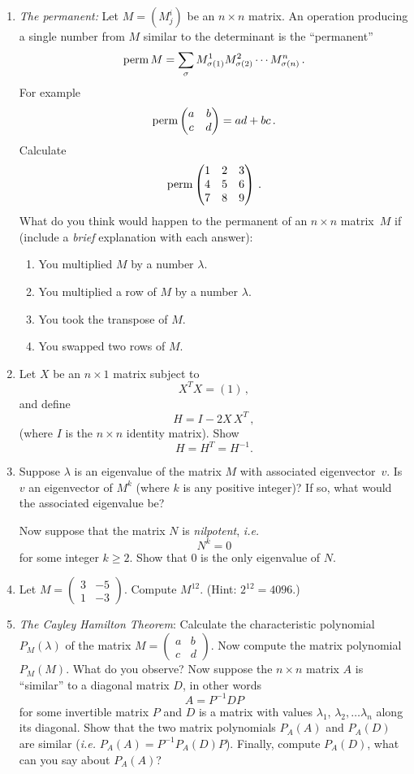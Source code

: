 \begin{enumerate}
\item
{\itshape The permanent:} Let $M=(M^i_j)$ be an $n\times n$ matrix. An operation producing a single number from $M$ similar
to the determinant is the ``permanent''
\[
{\rm perm} \, M =\sum_\sigma M^1_{\sigma(1)} M^2_{\sigma(2)}\cdots M^n_{\sigma(n)}\, .
\]
For example
\[
{\rm perm} \begin{pmatrix}a & b \\ c & d\end{pmatrix}=ad+bc\, .
\]
{Calculate} 
\[
{\rm perm} \begin{pmatrix}1 & 2 & 3 \\ 4 & 5 & 6 \\ 7 & 8 & 9\end{pmatrix}\, .
\]
\noindent
What do you think would happen to the permanent of an $n\times n$ matrix~$M$ if (include a {\itshape brief} explanation with each answer):
\begin{enumerate}
\item You multiplied $M$ by a number $\lambda$.
\item You multiplied a row of $M$ by a number $\lambda$.
\item You took the transpose of $M$.
\item  You swapped two rows of $M$.
\end{enumerate}


\item
Let $X$ be an $n\times 1$ matrix subject to
\[
{X}^{T} X=(1)\, ,
\]
and define
\[
H=I - 2 X \,\!X^T\, ,
\]
(where $I$ is the $n\times n$ identity matrix).
Show 
\[
H=H^{T}=H^{-1}.
\]

\item Suppose $\lambda$ is an eigenvalue of the matrix $M$ with associated eigenvector~$v$.
Is~$v$ an eigenvector of $M^k$ (where $k$ is any positive integer)? If so, what would the associated
eigenvalue be?

Now suppose that the matrix $N$ is {\itshape nilpotent}, {\itshape i.e.}
\[
N^k=0
\]
for some integer $k\geq 2$. Show that 0 is the only eigenvalue of $N$.

\item
Let $M=\begin{pmatrix}3&-5\\[2mm]1&-3\end{pmatrix}$. Compute $M^{12}$. (Hint: $2^{12}=4096$.)

\item {\itshape The Cayley Hamilton Theorem}:
Calculate the characteristic polynomial $P_M(\lambda)$ of the matrix $M=\begin{pmatrix}a & b\\c & d\end{pmatrix}$.
Now compute the matrix polynomial $P_M(M)$. What do you observe? Now suppose the $n\times n$ matrix $A$
is ``similar'' to a diagonal matrix $D$, in other words \[A=P^{-1}DP\] for some invertible matrix $P$ and $D$ is a matrix with values $\lambda_1$, $\lambda_2,\ldots \lambda_n$ along its diagonal. Show that the two matrix polynomials $P_A(A)$ and $P_A(D)$ are similar ({\itshape i.e.} $P_A(A)=P^{-1} P_A(D) P$).
Finally, compute $P_A(D)$, what can you say about $P_A(A)$?


\end{enumerate}
